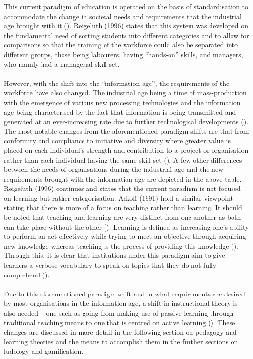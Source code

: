 \noindent This current paradigm of education is operated on the basis of standardisation to accommodate the change in societal needs and requirements that the industrial age brought with it (\cite{Reigeluth1996}). Reigeluth (1996) states that this system was developed on the fundamental need of sorting students into different categories and to allow for comparisons so that the training of the workforce could also be separated into different groups, those being labourers, having “hands-on” skills, and managers, who mainly had a managerial skill set. 
\\\\
However, with the shift into the “information age”, the requirements of the workforce have also changed. The industrial age being a time of mass-production with the emergence of various new processing technologies and the information age being characterised by the fact that information is being transmitted and generated at an ever-increasing rate due to further technological developments (\cite{gibson2006games, Reigeluth1996}). The most notable changes from the aforementioned paradigm shifts are that from conformity and compliance to initiative and diversity where greater value is placed on each individual’s strength and contribution to a project or organisation rather than each individual having the same skill set (\cite{Reigeluth1996}).  A few other differences between the needs of organisations during the industrial age and the new requirements brought with the information age are depicted in the above table.
\newpage
\noindent Reigeluth (1996) continues and states that the current paradigm is not focused on learning but rather categorisation. Ackoff (1991) hold a similar viewpoint stating that there is more of a focus on teaching rather than learning. It should be noted that teaching and learning are very distinct from one another as both can take place without the other (\cite{Ackoff1991}). Learning is defined as increasing one’s ability to perform an act effectively while trying to meet an objective through acquiring new knowledge whereas teaching is the process of providing this knowledge (\cite{Ackoff1991}). Through this, it is clear that institutions under this paradigm aim to give learners a verbose vocabulary to speak on topics that they do not fully comprehend (\cite{Ackoff1991}). 
\\\\
Due to this aforementioned paradigm shift and in what requirements are desired by most organisations in the information age, a shift in instructional theory is also needed – one such as going from making use of passive learning through traditional teaching means to one that is centred on active learning (\cite{Reigeluth1996}). These changes are discussed in more detail in the following section on pedagogy and learning theories and the means to accomplish them in the further sections on ludology and gamification.

